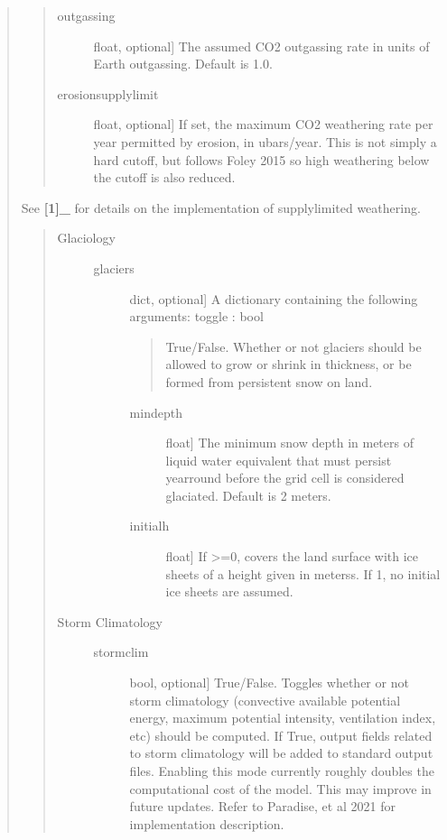 \documentclass[letterpaper,10pt,english]{sphinxmanual}
\begin{document}
\begin{fulllineitems}
\begin{fulllineitems}
\begin{quote}
\begin{quote}
\begin{description}
\begin{description}
\item[{outgassing}] \leavevmode{[}float, optional{]}
The assumed CO2 outgassing rate in units of Earth outgassing. Default is 1.0.

\item[{erosionsupplylimit}] \leavevmode{[}float, optional{]}
If set, the maximum CO2 weathering rate per year permitted by
erosion, in ubars/year. This is not simply a hard cutoff, but follows
Foley 2015 so high weathering below the cutoff is also reduced.

\end{description}

\end{description}
\end{quote}

See {\color{red}\bfseries{}{[}1{]}\_} for details on the implementation of supply\sphinxhyphen{}limited weathering.
\begin{quote}
\begin{description}
\item[{Glaciology}] \leavevmode\begin{description}
\item[{glaciers}] \leavevmode{[}dict, optional{]}
A dictionary containing the following arguments:
toggle : bool
\begin{quote}

True/False. Whether or not glaciers should be allowed to grow or shrink in thickness, or be formed from persistent snow on land.
\end{quote}
\begin{description}
\item[{mindepth}] \leavevmode{[}float{]}
The minimum snow depth in meters of liquid water equivalent that must persist year\sphinxhyphen{}round before the grid cell is considered glaciated. Default is 2 meters.

\item[{initialh}] \leavevmode{[}float{]}
If \textgreater{}=0, covers the land surface with ice sheets of a height given in meterss. If \sphinxhyphen{}1, no initial ice sheets are assumed.

\end{description}

\end{description}

\item[{Storm Climatology}] \leavevmode\begin{description}
\item[{stormclim}] \leavevmode{[}bool, optional{]}
True/False. Toggles whether or not storm climatology (convective available
potential energy, maximum potential intensity, ventilation index, etc)
should be computed. If True, output fields related to storm climatology
will be added to standard output files. Enabling this mode currently roughly
doubles the computational cost of the model. This may improve in future
updates. Refer to Paradise, et al 2021 for implementation description.


\end{description}
\end{description}
\end{quote}
\end{quote}
\end{fulllineitems}
\end{fulllineitems}
\end{document}
